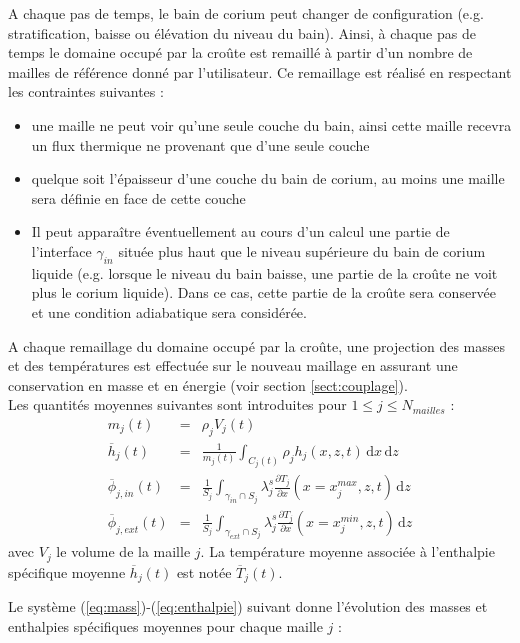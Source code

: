 A chaque pas de temps, le bain de corium peut changer de configuration (e.g. stratification, baisse ou élévation du niveau du bain). Ainsi, à chaque pas de temps le domaine occupé par la croûte est remaillé à partir d'un nombre de mailles de référence donné par l'utilisateur. Ce remaillage est réalisé en respectant les contraintes suivantes :
\begin{itemize}
    \item une maille ne peut voir qu'une seule couche du bain, ainsi cette maille recevra un flux thermique ne provenant que d'une seule couche
    \item quelque soit l'épaisseur d'une couche du bain de corium, au moins une maille sera définie en face de cette couche
    \item  Il peut apparaître éventuellement au cours d'un calcul une partie de l'interface $\gamma_{in}$ située plus haut que le niveau supérieure du bain de corium liquide (e.g. lorsque le niveau du bain baisse, une partie de la croûte ne voit plus le corium liquide). Dans ce cas, cette partie de la croûte sera conservée et une condition adiabatique sera considérée.\\
\end{itemize}

A chaque remaillage du domaine occupé par la croûte, une projection des masses et des températures est effectuée sur le nouveau maillage en assurant une conservation en masse et en énergie (voir section \ref{sect:couplage}).\\

Les quantités moyennes suivantes sont introduites pour $1 \leq j\leq N_{mailles}$ :
\begin{eqnarray}
m_{j}(t) &=& \rho_j  V_j(t) \\
\overline{h}_j(t) &=& \frac{1}{m_j(t)} \int_{C_j(t)} \rho_j h_j(x,z,t)\,\mathrm{d}x\, \mathrm{d}z\\
\overline{\phi}_{j,in}(t) &=& \frac{1}{S_j}\int_{\gamma_{in}\cap S_j}\lambda_j^s \frac{\partial T_{j}}{\partial x}(x=x_j^{max},z,t)\, \mathrm{d}z  \label{eq:phi_j_in}\\
\overline{\phi}_{j,ext}(t) &=& \frac{1}{S_j}\int_{\gamma_{ext}\cap S_j}\lambda_j^s \frac{\partial T_{j}}{\partial x} (x=x_j^{min},z,t)\, \mathrm{d}z  \label{eq:phi_j_ext}
\end{eqnarray}
avec $V_j$ le volume de la maille $j$. La température moyenne associée à l'enthalpie spécifique moyenne $\overline{h}_j(t)$ est notée $\overline{T}_{j}(t)$.


Le système (\ref{eq:mass})-(\ref{eq:enthalpie}) suivant donne l'évolution des masses et enthalpies spécifiques moyennes pour chaque maille $j$ :

